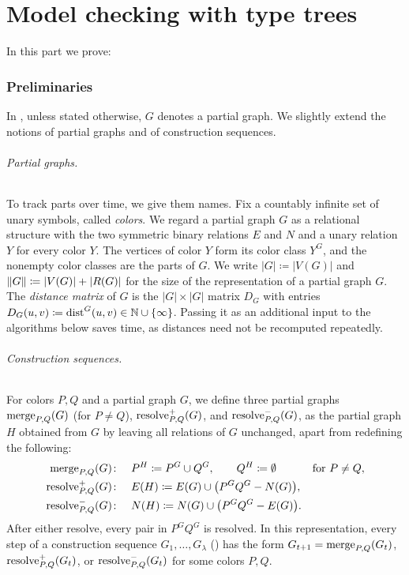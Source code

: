  \part{Model checking with type trees}
 \label{part:mc}


 In this part we prove:
{\renewcommand{\mcdepth}{d}\mcthm*}


\section{Preliminaries}\label{sec:mc-prelims}

In ,
unless stated otherwise, $G$ denotes a partial graph.
We slightly extend the notions of partial graphs and of construction sequences.

\paragraph{Partial graphs.}
To track parts over time, we give them names.
Fix a countably infinite set of unary symbols, called \emph{colors}.
We regard a partial graph $G$ as a relational structure with the two symmetric binary relations $E$ and $N$ and a unary relation $Y$ for every color $Y$.
The vertices of color $Y$ form its color class $Y^G$, and the nonempty color classes are the parts of $G$.
We write $|G|\coloneqq|V(G)|$ and $\size G\coloneqq|V(G)|+|R(G)|$ for the size of the representation of a partial graph $G$.
The \emph{distance matrix} of $G$ is the $|G|\times|G|$ matrix $D_G$ with entries $D_G(u,v)\coloneqq\dist^G(u,v)\in\N\cup\set\infty$.
Passing it as an additional input to the algorithms below saves time, as distances need not be recomputed repeatedly.

\paragraph{Construction sequences.}
For colors $P,Q$ and a partial graph $G$, we define three partial graphs
$\merge PQ(G)$ (for $P\neq Q$), $\resolve+PQ(G)$, and $\resolve-PQ(G)$, as the partial graph $H$ obtained from $G$ by leaving all relations of $G$ unchanged, apart from redefining the following:
\begin{align*}
\merge PQ(G)\colon\quad&
P^{H}\coloneqq P^G\cup Q^G,
\qquad
Q^{H}\coloneqq\emptyset
&&\text{for $P\ne Q$},\\
\resolve+PQ(G)\colon\quad&
E(H)\coloneqq E(G)\cup\bigl(P^GQ^G\setminus N(G)\bigr),\\
\resolve-PQ(G)\colon\quad&
N(H)\coloneqq N(G)\cup\bigl(P^GQ^G\setminus E(G)\bigr).
\end{align*}
After either resolve, every pair in $P^GQ^G$ is resolved.
In this representation, every step of a construction sequence $G_1,\ldots,G_\lambda$ () has the form $G_{t+1}=\merge PQ(G_t)$, $\resolve+PQ(G_t)$, or $\resolve-PQ(G_t)$ for some colors $P,Q$.




